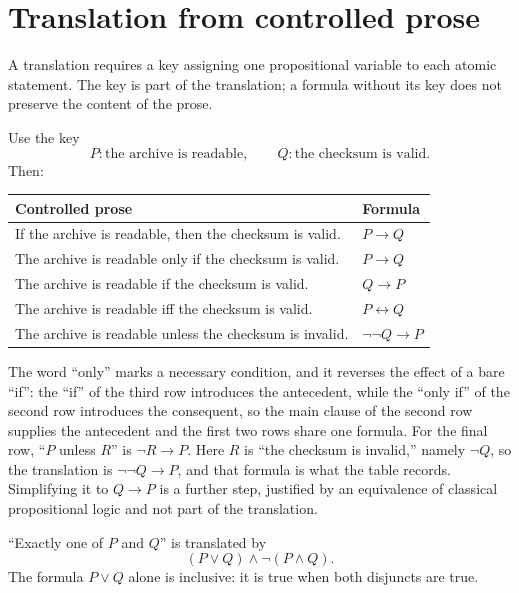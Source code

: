 \section{Translation from controlled prose}
\label{sec:prop-syntax-semantics-03}

A translation requires a key assigning one propositional variable to each
atomic statement.  The key is part of the translation; a formula without its
key does not preserve the content of the prose.

\begin{example}
Use the key
\[
  P:\text{the archive is readable},
  \qquad Q:\text{the checksum is valid}.
\]
Then:
\begin{center}
\begin{tabular}{@{}ll@{}}
\toprule
Controlled prose & Formula \\ \midrule
If the archive is readable, then the checksum is valid. & \(P\to Q\) \\
The archive is readable only if the checksum is valid. & \(P\to Q\) \\
The archive is readable if the checksum is valid. & \(Q\to P\) \\
The archive is readable iff the checksum is valid. & \(P\leftrightarrow Q\) \\
The archive is readable unless the checksum is invalid. & \(\neg\neg Q\to P\) \\
\bottomrule
\end{tabular}
\end{center}
The word ``only'' marks a necessary condition, and it reverses the effect
of a bare ``if'': the ``if'' of the third row introduces the antecedent,
while the ``only if'' of the second row introduces the consequent, so the
main clause of the second row supplies the antecedent and the first two
rows share one formula.
For the final row, ``\(P\) unless \(R\)'' is \(\neg R\to P\).  Here
\(R\) is ``the checksum is invalid,'' namely \(\neg Q\), so the translation
is \(\neg\neg Q\to P\), and that formula is what the table records.
Simplifying it to \(Q\to P\) is a further step, justified by an equivalence
of classical propositional logic and not part of the translation.
\end{example}

\begin{example}
``Exactly one of \(P\) and \(Q\)'' is translated by
\[
  (P\lor Q)\land\neg(P\land Q).
\]
The formula \(P\lor Q\) alone is inclusive: it is true when both disjuncts are
true.
\end{example}

